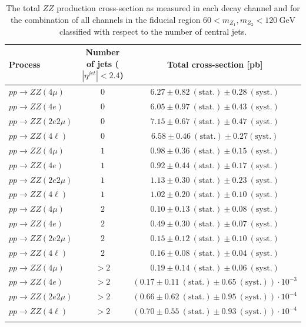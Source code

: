 \begin{table}[htbH]
\begin{center}
\caption{\footnotesize{The total $ZZ$ production cross-section as measured in each decay channel and for the combination of all channels in the fiducial region $60< m_{Z_{1}}, m_{Z_{2}} < 120~\mathrm{GeV}$ classified with respect to the number of central jets.}}
\label{tab:xs_ncentraljets}
\begin{tabular}{lcc}
\hline Process & Number of jets ($|\eta^{jet}|< 2.4$) & Total cross-section [pb]\\
\hline $pp\to ZZ(4\mu) $ & $ 0 $ & $6.27\pm 0.82~\mathrm{(stat.)}\pm 0.28~\mathrm{(syst.)}$\\
$pp\to ZZ(4e) $ & $  0 $ & $6.05\pm 0.97~\mathrm{(stat.)}\pm 0.43~\mathrm{(syst.)}$\\
$pp\to ZZ(2e2\mu)$ & $ 0 $ &  $7.15\pm 0.67~\mathrm{(stat.)}\pm 0.47~\mathrm{(syst.)}$\\
\hline
\textbf{$pp\to ZZ(4\ell)$} & $0$ & $6.58 \pm 0.46~\mathrm{(stat.)}\pm 0.27\mathrm{(syst.)}$ \\
\hline
$pp\to ZZ(4\mu) $ & $1$ & $0.98\pm 0.36~\mathrm{(stat.)}\pm 0.15~\mathrm{(syst.)}$\\
$pp\to ZZ(4e) $ &  $1$ & $0.92\pm 0.44~\mathrm{(stat.)}\pm 0.17~\mathrm{(syst.)}$\\
$pp\to ZZ(2e2\mu)$ & $1$ & $1.13\pm 0.30~\mathrm{(stat.)}\pm 0.23~\mathrm{(syst.)}$\\
\hline
\textbf{$pp\to ZZ(4\ell)$} & $1$ & $1.02 \pm 0.20~\mathrm{(stat.)}\pm 0.10~\mathrm{(syst.)}$ \\
\hline 
$pp\to ZZ(4\mu) $ & $2$ & $0.10\pm 0.13~\mathrm{(stat.)}\pm 0.08~\mathrm{(syst.)}$\\
$pp\to ZZ(4e) $ &  $2$ & $0.49\pm 0.30~\mathrm{(stat.)}\pm 0.07~\mathrm{(syst.)}$\\
$pp\to ZZ(2e2\mu)$ & $2$ & $0.15\pm 0.12~\mathrm{(stat.)}\pm 0.10~\mathrm{(syst.)}$\\
\hline
\textbf{$pp\to ZZ(4\ell)$} & $2$ & $0.16 \pm 0.08~\mathrm{(stat.)}\pm 0.04~\mathrm{(syst.)}$ \\
\hline 
$pp\to ZZ(4\mu) $ & $>2$ & $0.19\pm 0.14~\mathrm{(stat.)}\pm 0.06~\mathrm{(syst.)}$\\
$pp\to ZZ(4e) $ & $>2$ & $(0.17\pm 0.11~\mathrm{(stat.)}\pm 0.65~\mathrm{(syst.)}) \cdot 10^{-3}$\\
$pp\to ZZ(2e2\mu)$ & $>2$ & $(0.66 \pm 0.62~\mathrm{(stat.)}\pm 0.95~\mathrm{(syst.)})\cdot 10^{-4}$\\
\hline
\textbf{$pp\to ZZ(4\ell)$} & $>2$ & $(0.70\pm 0.55~\mathrm{(stat.)} \pm 0.93~\mathrm{(syst.)}) \cdot 10^{-4}$ \\
\hline \\
\end{tabular}%
\end{center}
\end{table}

